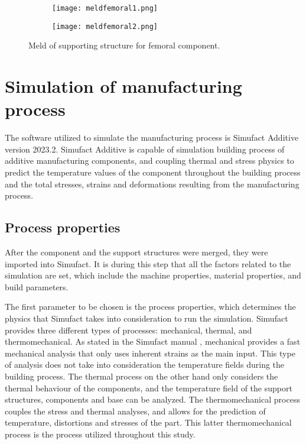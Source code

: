 \documentclass[../main.tex]{subfiles}
\begin{document}
\begin{figure}
  \begin{subfigure}{0.45\textwidth}
    \texttt{[image: meldfemoral1.png]}
  \end{subfigure}
  \begin{subfigure}{0.45\textwidth}
      \texttt{[image: meldfemoral2.png]}
    \end{subfigure}
  \caption{Meld of supporting structure for femoral component.}
\end{figure}

\section{Simulation of manufacturing process}

The software utilized to simulate the manufacturing process is Simufact Additive version 2023.2. Simufact Additive is capable of simulation building process of additive manufacturing components, and coupling thermal and stress physics to predict the temperature values of the component throughout the building process and the total stresses, strains and deformations resulting from the manufacturing process. 

\subsection{Process properties}

After the component and the support structures were merged, they were imported into Simufact. It is during this step that all the factors related to the simulation are set, which include the machine properties, material properties, and build parameters. 

The first parameter to be chosen is the process properties, which determines the physics that Simufact takes into consideration to run the simulation. Simufact provides three different types of processes: mechanical, thermal, and thermomechanical. As stated in the Simufact manual \cite{hexagonabProcessPropertiesInfosheet}, mechanical provides a fast mechanical analysis that only uses inherent strains as the main input. This type of analysis does not take into consideration the temperature fields during the building process. The thermal process on the other hand only considers the thermal behaviour of the components, and the temperature field of the support structures, components and base can be analyzed. The thermomechanical process couples the stress and thermal analyses, and allows for the prediction of temperature, distortions and stresses of the part. This latter thermomechanical process is the process utilized throughout this study.
\end{document}
